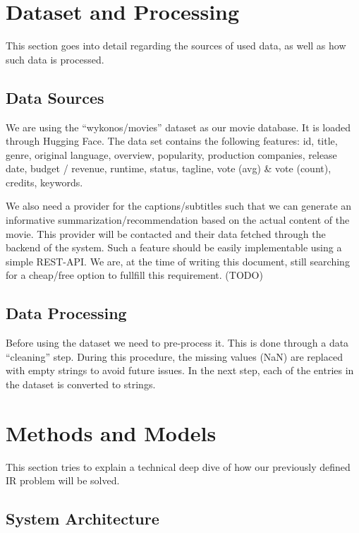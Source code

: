 \documentclass[12pt,a4paper]{article}
\begin{document}
  \section{Dataset and Processing}

  This section goes into detail regarding the sources of used data, as well as how such data is processed.

  \subsection{Data Sources}

  We are using the ``wykonos/movies'' dataset as our movie database.
  It is loaded through Hugging Face.
  The data set contains the following features:
  id, title, genre, original language, overview, popularity, production companies, release date, budget / revenue, runtime, status, tagline, vote (avg) \& vote (count), credits, keywords.

  We also need a provider for the captions/subtitles such that we can generate an informative summarization/recommendation based on the actual content of the movie.
  This provider will be contacted and their data fetched through the backend of the system.
  Such a feature should be easily implementable using a simple REST-API.
  We are, at the time of writing this document, still searching for a cheap/free option to fullfill this requirement. (TODO)

  \subsection{Data Processing}

  Before using the dataset we need to pre-process it.
  This is done through a data ``cleaning'' step.
  During this procedure, the missing values (NaN) are replaced with empty strings to avoid future issues.
  In the next step, each of the entries in the dataset is converted to strings.

  \section{Methods and Models}

  This section tries to explain a technical deep dive of how our previously defined IR problem will be solved.

  \subsection{System Architecture}
\end{document}
